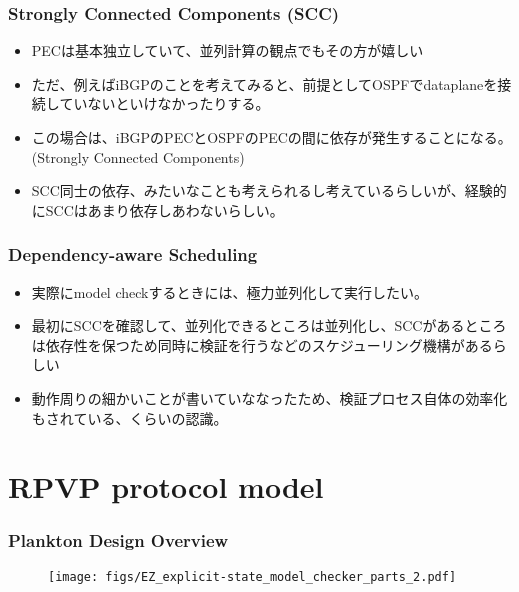 \documentclass[dvipdfmx,9pt,notheorems]{beamer}
\theoremstyle{definition}
\begin{document}
\begin{frame}\frametitle{Strongly Connected Components (SCC)}
\begin{itemize}
	\item PECは基本独立していて、並列計算の観点でもその方が嬉しい
	\item ただ、例えばiBGPのことを考えてみると、前提としてOSPFでdataplaneを接続していないといけなかったりする。
	\item この場合は、iBGPのPECとOSPFのPECの間に依存が発生することになる。(Strongly Connected Components)
	\item SCC同士の依存、みたいなことも考えられるし考えているらしいが、経験的にSCCはあまり依存しあわないらしい。
\end{itemize}
\end{frame}

\begin{frame}\frametitle{Dependency-aware Scheduling}
\begin{itemize}
	\item 実際にmodel checkするときには、極力並列化して実行したい。
	\item 最初にSCCを確認して、並列化できるところは並列化し、SCCがあるところは依存性を保つため同時に検証を行うなどのスケジューリング機構があるらしい
	\item 動作周りの細かいことが書いていななったため、検証プロセス自体の効率化もされている、くらいの認識。
\end{itemize}
\end{frame}


\section{RPVP protocol model}

\begin{frame}\frametitle{Plankton Design Overview}
  \begin{figure}[htb]
    \centering
		\texttt{[image: figs/EZ\_explicit-state\_model\_checker\_parts\_2.pdf]}
  \end{figure}%
\end{frame}
\end{document}
